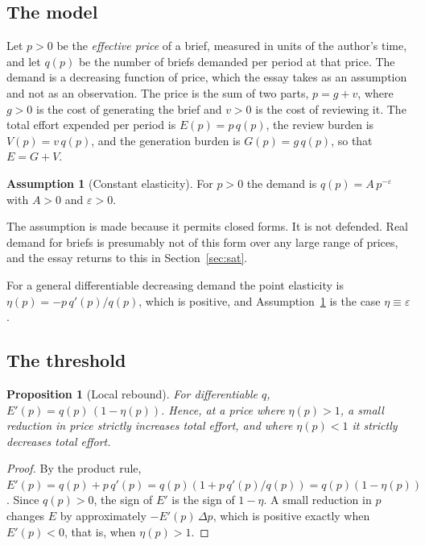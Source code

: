 \documentclass[11pt]{article}
\theoremstyle{plain}
\newtheorem{proposition}[theorem]{Proposition}
\theoremstyle{definition}
\newtheorem{assumption}[theorem]{Assumption}
\theoremstyle{remark}
\begin{document}
\subsection{The model}

Let $p>0$ be the \emph{effective price} of a brief, measured in units of the author's time, and let $q(p)$ be the number of briefs demanded per period at that price. The demand is a decreasing function of price, which the essay takes as an assumption and not as an observation. The price is the sum of two parts, $p=g+v$, where $g>0$ is the cost of generating the brief and $v>0$ is the cost of reviewing it. The total effort expended per period is $E(p)=p\,q(p)$, the review burden is $V(p)=v\,q(p)$, and the generation burden is $G(p)=g\,q(p)$, so that $E=G+V$.

\begin{assumption}[Constant elasticity]\label{ass:elast}
For $p>0$ the demand is $q(p)=A\,p^{-\varepsilon}$ with $A>0$ and $\varepsilon>0$.
\end{assumption}

The assumption is made because it permits closed forms. It is not defended. Real demand for briefs is presumably not of this form over any large range of prices, and the essay returns to this in Section~\ref{sec:sat}.

For a general differentiable decreasing demand the point elasticity is $\eta(p)=-p\,q'(p)/q(p)$, which is positive, and Assumption~\ref{ass:elast} is the case $\eta\equiv\varepsilon$.

\subsection{The threshold}

\begin{proposition}[Local rebound]\label{prop:local}
For differentiable $q$, $E'(p)=q(p)\,(1-\eta(p))$. Hence, at a price where $\eta(p)>1$, a small reduction in price strictly increases total effort, and where $\eta(p)<1$ it strictly decreases total effort.
\end{proposition}

\begin{proof}
By the product rule, $E'(p)=q(p)+p\,q'(p)=q(p)\left(1+p\,q'(p)/q(p)\right)=q(p)(1-\eta(p))$. Since $q(p)>0$, the sign of $E'$ is the sign of $1-\eta$. A small reduction in $p$ changes $E$ by approximately $-E'(p)\,\Delta p$, which is positive exactly when $E'(p)<0$, that is, when $\eta(p)>1$. \qedhere
\end{proof}
\end{document}
